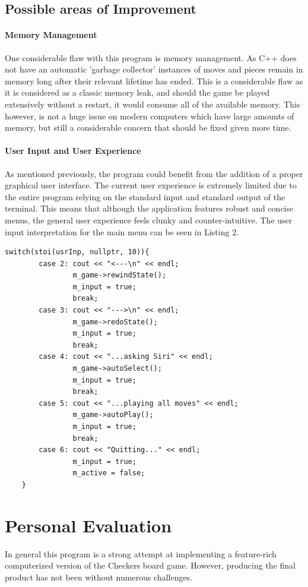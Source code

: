 \documentclass[10pt, a4paper]{article}
\begin{document}
	\subsection{Possible areas of Improvement}
    \paragraph{Memory Management}
    One considerable flaw with this program is memory management. As C++ does not have an automatic 'garbage collector'  instances of moves and pieces remain in memory long after their relevant lifetime has ended. This is a considerable flaw as it is considered as a classic memory leak, and should the game be played extensively without a restart, it would consume all of the available memory. This however, is not a huge issue on modern computers which have large amounts of memory, but still a considerable concern that should be fixed given more time.
    \paragraph{User Input and User Experience}
    As mentioned previously, the program could benefit from the addition of a proper graphical user interface. The current user experience is extremely limited due to the entire program relying on the standard input and standard output of the terminal. This means that although the application features robust and concise menus, the general user experience feels clunky and counter-intuitive. 
    The user input interpretation for the main menu can be seen in Listing 2.
    \newpage
    \begin{lstlisting}[caption = User Input Interpretation using Select Case in C++]
	switch(stoi(usrInp, nullptr, 10)){
    	case 2: cout << "<---\n" << endl;
    			m_game->rewindState();
    			m_input = true;
    			break;
    	case 3: cout << "--->\n" << endl;
    			m_game->redoState();
    			m_input = true;
    			break;
    	case 4: cout << "...asking Siri" << endl;
    			m_game->autoSelect();
    			m_input = true;
    			break;
    	case 5: cout << "...playing all moves" << endl;
    			m_game->autoPlay();
    			m_input = true;
    			break;
    	case 6: cout << "Quitting..." << endl;
    			m_input = true;
    			m_active = false;
    }
	\end{lstlisting}
    
	\section{Personal Evaluation}
	In general this program is a strong attempt at implementing a feature-rich computerized version of the Checkers board game. However, producing the final product has not been without numerous challenges.
\end{document}
